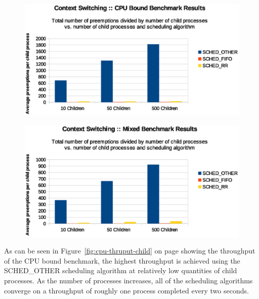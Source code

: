 \begin{figure}[H]
  \centering
  \includegraphics[scale=0.8]{img/cpu-cs-child.eps}
  \caption{}
  \label{fig:cpu-cs-child}
\end{figure}

\begin{figure}[H]
  \centering
  \includegraphics[scale=0.8]{img/mix-cs-child.eps}
  \caption{}
  \label{fig:mix-cs-child}
\end{figure}

As can be seen in Figure~\ref{fig:cpu-thruput-child} on page \pageref{fig:cpu-thruput-child} showing the throughput of the CPU bound benchmark, the highest throughput is achieved using the SCHED\_OTHER scheduling algorithm at relatively low quantities of child processes.  As the number of processes increases, all of the scheduling algorithms converge on a throughput of roughly one process completed every two seconds.


